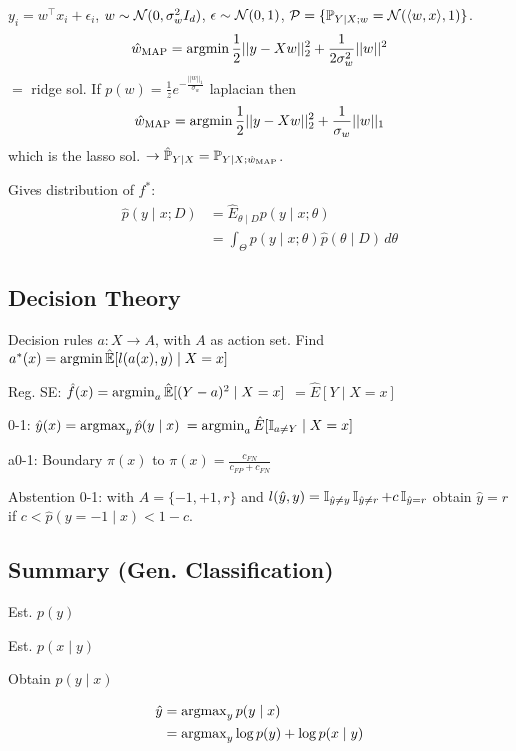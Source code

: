 \begin{definition}[Ex. Reg.]
  \(y_i = w^\top x_i + \epsilon_i\), \(w \sim \normal(0 , \sigma_w^2 I_d)\), \(\epsilon \sim \normal(0, 1)\), \(\mathcal{P} = \{\P_{Y \mid X; w} = \normal(\langle w, x\rangle, 1)\}\).
  \[\hat{w}_{\text{MAP}} = \argmin \frac{1}{2}||y- Xw||_2^2 + \frac{1}{2\sigma_w^2} ||w||^2\]
  \(=\) ridge sol. If \(p(w) = \frac{1}{z}e^{-\frac{||w||_1}{\sigma_w}}\) laplacian then
  \[\hat{w}_{\text{MAP}} = \argmin \frac{1}{2}||y- Xw||_2^2 + \frac{1}{\sigma_w} ||w||_1\]
  which is the lasso sol. \(\to \hat{\P}_{Y \mid X} = \P_{Y \mid X; \hat{w}_{\text{MAP}}}\).
\end{definition}

\begin{definition}
  Gives distribution of \(f^*\):
  \begin{align*}
    \hat{p}(y \mid x; D) &= \hat{E}_{\theta \mid D}p(y \mid x; \theta) \\
    &= \int_\Theta p(y \mid x; \theta) \hat{p}(\theta \mid D) \, d\theta
  \end{align*}
\end{definition}

\subsection{Decision Theory}
Decision rules \(a : X \to A\), with \(A\) as action set.
Find \(a^*(x) = \argmin \hat{\E}[l(a(x), y) \mid X = x]\)

\begin{definition}
  \begin{itemize*}
    \item Reg. SE: \(\hat{f}(x) = \argmin_a \hat{\E}[(Y - a)^2 \mid X=x]\) \(= \hat{E}[Y \mid X = x]\)
    \item 0-1: \(\hat{y}(x) = \argmax_y \hat{p}(y \mid x) \) \(= \argmin_a \hat{E}[\I_{a \neq Y} \mid X = x]\)
    \item a0-1: Boundary \(\pi(x)\) to \(\pi(x) = \frac{c_{FN}}{c_{FP} + c_{FN}}\)
    \item Abstention 0-1: with \(A = \{-1, +1, r\}\) and \(l(\hat{y}, y) = \I_{\hat{y} \neq y}\I_{\hat{y} \neq r} + c \I_{\hat{y} = r}\) obtain \(\hat{y} = r\) if \(c < \hat{p}(y = -1 \mid x) < 1 - c\).
  \end{itemize*}
\end{definition}

\subsection{Summary (Gen. Classification)}
\begin{enumerate*}
  \item Est. \(p(y)\)
  \item Est. \(p(x \mid y)\)
  \item Obtain \(p(y \mid x)\)
\end{enumerate*}
\begin{align*}
  \hat{y} &= \argmax_y p(y \mid x) \\ &= \argmax_y \log p(y) + \log p(x \mid y)
\end{align*}